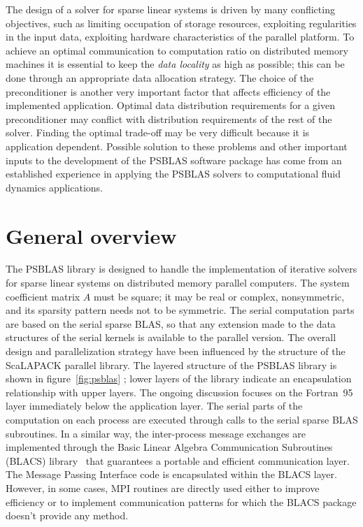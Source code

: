 The design of a solver for sparse linear systems is driven by many
conflicting objectives, such as limiting occupation of storage
resources, exploiting regularities in the input data, exploiting
hardware characteristics of the parallel platform.  To achieve an
optimal communication to computation ratio on distributed memory
machines it is essential to keep the {\em data locality} as high as
possible; this can be done through an appropriate data allocation
strategy.  The choice of the preconditioner is another very important
factor that affects efficiency of the implemented application. Optimal
data distribution requirements for a given preconditioner may conflict
with distribution requirements of the rest of the solver. Finding the
optimal trade-off may be very difficult because it is application
dependent.  Possible solution to these problems and other important
inputs to the development of the PSBLAS software package has come from
an established experience in applying the PSBLAS solvers to
computational fluid dynamics applications.

\section{General overview}
\label{sec:overview} 
The PSBLAS library is designed to handle the implementation of
iterative solvers for sparse linear systems on distributed memory
parallel computers.  The system coefficient matrix $A$ must be square;
it may be real or complex, nonsymmetric, and its sparsity pattern
needs not to be symmetric.  The serial computation parts are based on
the serial sparse BLAS, so that any extension made to the data
structures of the serial kernels is available to the parallel
version. The overall design and parallelization strategy have been
influenced by the structure of the ScaLAPACK parallel
library.  The layered structure of the PSBLAS library
is shown in figure~\ref{fig:psblas} ; lower layers of the library
indicate an encapsulation relationship with upper layers. The ongoing
discussion focuses on the Fortran~95 layer immediately below the
application layer.
The serial parts of the computation on each process are executed through
calls to the serial sparse BLAS subroutines. In a similar way, the
inter-process message exchanges are implemented through the Basic
Linear Algebra Communication Subroutines (BLACS) library~\cite{BLACS}
that guarantees a portable and efficient communication layer. The
Message Passing Interface code is encapsulated within the BLACS
layer. However, in some cases, MPI routines are directly used either
to improve efficiency or to implement communication patterns for which
the BLACS package doesn't provide any method. 

